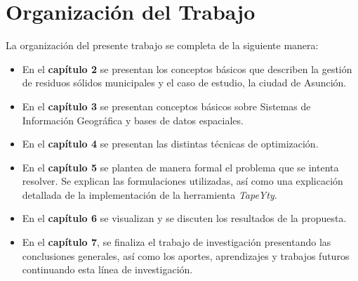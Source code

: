 \section{Organización del Trabajo}

La organización del presente trabajo se completa de la siguiente manera:

\begin{itemize}
    \item En el \textbf{capítulo 2} se presentan los conceptos básicos que describen la gestión de residuos sólidos municipales y el caso de estudio, la ciudad de Asunción.
    \item En el \textbf{capítulo 3} se presentan conceptos básicos sobre Sistemas de Información Geográfica y bases de datos espaciales.
    \item En el \textbf{capítulo 4} se presentan las distintas técnicas de optimización.    
    \item En el \textbf{capítulo 5} se plantea de manera formal el problema que se intenta resolver. Se explican las formulaciones utilizadas, así como una explicación detallada de la implementación de la herramienta \textit{TapeYty}. 
    \item En el \textbf{capítulo 6} se visualizan y se discuten los resultados de la propuesta.
    \item En el \textbf{capítulo 7}, se finaliza el trabajo de investigación presentando las conclusiones generales, así como los aportes, aprendizajes y trabajos futuros continuando esta línea de investigación.
\end{itemize}